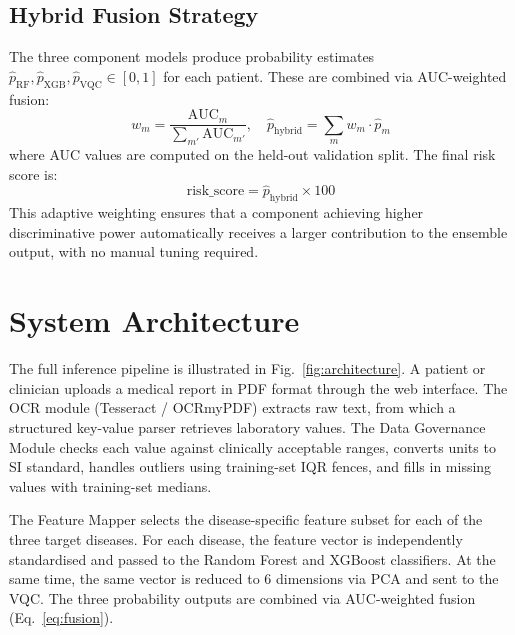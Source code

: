 ﻿\documentclass[conference]{IEEEtran}
\begin{document}
\subsection{Hybrid Fusion Strategy}

The three component models produce probability estimates
$\hat{p}_{\text{RF}}, \hat{p}_{\text{XGB}}, \hat{p}_{\text{VQC}} \in [0,1]$ for each
patient. These are combined via AUC-weighted fusion:
\begin{equation}
    w_m = \frac{\text{AUC}_m}{\sum_{m'} \text{AUC}_{m'}}, \quad
    \hat{p}_{\text{hybrid}} = \sum_{m} w_m \cdot \hat{p}_m
    \label{eq:fusion}
\end{equation}
where AUC values are computed on the held-out validation split. The final risk score is:
\begin{equation}
    \text{risk\_score} = \hat{p}_{\text{hybrid}} \times 100
    \label{eq:risk_score}
\end{equation}
This adaptive weighting ensures that a component achieving higher discriminative power
automatically receives a larger contribution to the ensemble output, with no manual
tuning required.

\section{System Architecture}
\label{sec:architecture}

The full inference pipeline is illustrated in Fig.~\ref{fig:architecture}. A patient or
clinician uploads a medical report in PDF format through the web interface. The OCR
module (Tesseract / OCRmyPDF) extracts raw text, from which a structured key-value
parser retrieves laboratory values. The Data Governance Module checks each value against
clinically acceptable ranges, converts units to SI standard, handles outliers using
training-set IQR fences, and fills in missing values with training-set medians.

The Feature Mapper selects the disease-specific feature subset for each of the three
target diseases. For each disease, the feature vector is independently standardised and
passed to the Random Forest and XGBoost classifiers. At the same time, the same vector
is reduced to 6 dimensions via PCA and sent to the VQC. The three probability outputs
are combined via AUC-weighted fusion (Eq.~\ref{eq:fusion}).
\end{document}
